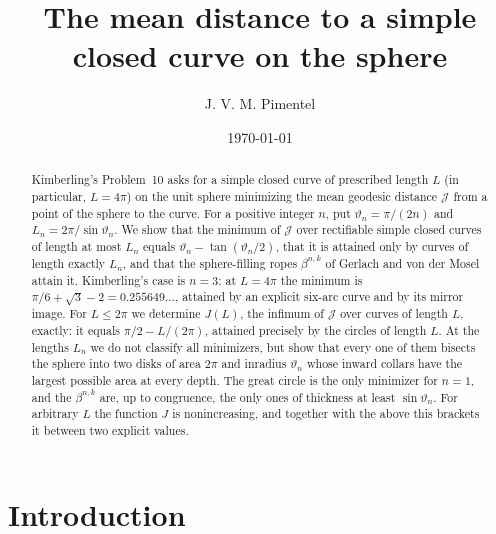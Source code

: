 \documentclass[11pt,oneside,reqno]{amsart}
\title[Mean distance to a curve on the sphere]
{The mean distance to a simple closed curve on the sphere}
\author{J. V. M. Pimentel}
\date{\today}
\theoremstyle{plain}
\theoremstyle{definition}
\newcommand{\bta}[2]{\beta^{#1,#2}}
\begin{document}
\begin{abstract}
Kimberling's Problem~10 asks for a simple closed curve of prescribed length
$L$ (in particular, $L=4\pi$) on the unit sphere
minimizing the mean geodesic distance $\mathcal{J}$ from a point of the sphere to the
curve. For a positive integer $n$, put $\vartheta_{n}=\pi/(2n)$ and
$L_{n}=2\pi/\sin\vartheta_{n}$. We show
that the minimum of $\mathcal{J}$ over rectifiable simple closed curves of length at most
$L_{n}$ equals $\vartheta_{n}-\tan(\vartheta_{n}/2)$, that it is attained only by curves of length
exactly $L_{n}$, and that the sphere-filling ropes $\bta{n}{k}$ of Gerlach and
von der Mosel attain it. Kimberling's case is $n=3$: at $L=4\pi$ the minimum is
$\pi/6+\sqrt{3}-2=0.255649\ldots$, attained by an explicit six-arc curve and by
its mirror image. For $L\le2\pi$ we determine $J(L)$, the infimum of
$\mathcal{J}$ over curves of length $L$, exactly: it equals $\pi/2-L/(2\pi)$,
attained precisely by the circles of length $L$. At the lengths $L_{n}$ we do not
classify all minimizers, but show that every one of
them bisects the sphere into two disks of area $2\pi$ and inradius
$\vartheta_{n}$ whose inward collars have the largest possible area at every
depth. The great circle is the only minimizer for $n=1$, and the $\bta{n}{k}$
are, up to congruence, the only ones of thickness at least $\sin\vartheta_{n}$.
For arbitrary $L$ the function $J$ is nonincreasing, and
together with the above this brackets it between two explicit values.
\end{abstract}

\maketitle

\section{Introduction}
\end{document}
